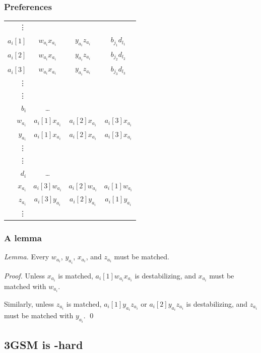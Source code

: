 \documentclass[mathserif,serif]{beamer}
\begin{document}
\begin{frame}
	\frametitle{Preferences}

	\begin{tabular}{r | c c c}
		\vdots \\
		$a_i[1]$ &	$w_{a_i}x_{a_i}$ &	$y_{a_i}z_{a_i}$ &	$b_{j_1}d_{l_1}$ \\
		$a_i[2]$ &	$w_{a_i}x_{a_i}$ &	$y_{a_i}z_{a_i}$ &	$b_{j_2}d_{l_2}$ \\
		$a_i[3]$ &	$w_{a_i}x_{a_i}$ &	$y_{a_i}z_{a_i}$ &	$b_{j_3}d_{l_3}$ \\
		\vdots \\
		\hline
		\vdots \\
		$b_i$ &		\dots \\
		$w_{a_i}$ &	$a_i[1]x_{a_i}$ &	$a_i[2]x_{a_i}$ &	$a_i[3]x_{a_i}$ \\
		$y_{a_i}$ &	$a_i[1]x_{a_i}$ &	$a_i[2]x_{a_i}$ &	$a_i[3]x_{a_i}$ \\
		\vdots \\
		\hline
		\vdots \\
		$d_i$ &		\dots \\
		$x_{a_i}$ &	$a_i[3]w_{a_i}$ &	$a_i[2]w_{a_i}$ &	$a_i[1]w_{a_i}$ \\
		$z_{a_i}$ &	$a_i[3]y_{a_i}$ &	$a_i[2]y_{a_i}$ &	$a_i[1]y_{a_i}$ \\
		\vdots \\
	\end{tabular}
\end{frame}

\begin{frame}
	\frametitle{A lemma}

	\emph{Lemma.}
	Every $w_{a_i}$, $y_{a_i}$, $x_{a_i}$, and $z_{a_i}$ must be matched.

	\emph{Proof.}
	Unless $x_{a_i}$ is matched, $a_i[1]w_{a_i}x_{a_i}$ is destabilizing, and $x_{a_i}$ must be matched with
	$w_{a_i}$.

	Similarly, unless $z_{a_i}$ is matched, $a_i[1]y_{a_i}z_{a_i}$ or $a_i[2]y_{a_i}z_{a_i}$ is destabilizing, and
	$z_{a_i}$ must be matched with $y_{a_i}$.
	\qed
\end{frame}



\subsection{3GSM is \NP-hard}
\end{document}
